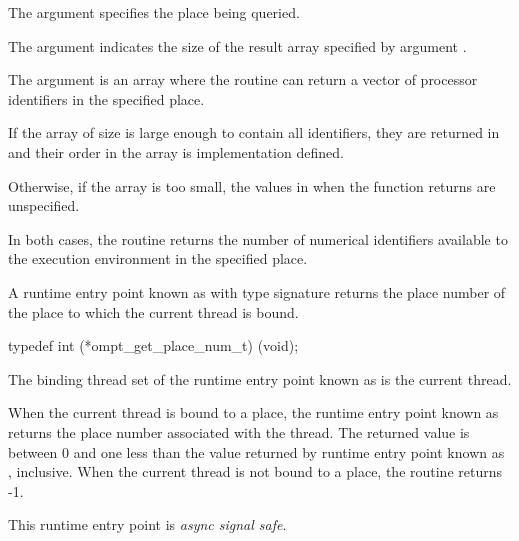 The argument  specifies the place being
queried.

The argument  indicates the size of the result
array specified by argument .

The argument  is an array where the routine can return
a vector of processor identifiers in the specified place.

\effect

If the array  of size  is large enough to
contain all identifiers, they are returned in  and
their order in the array is implementation defined.

Otherwise, if the  array is too small, the values in  when the function returns are unspecified.

In both cases, the routine returns the number of numerical identifiers
available to the execution environment in the specified place.



\label{sec:ompt_get_place_num_t}
\label{sec:ompt_get_place_num}

\summary

A runtime entry point known as
 with type signature
 returns
the place number of the place to which the current
thread is bound.

\format

\begin{ccppspecific}
\begin{omptInquiry}
typedef int (*ompt_get_place_num_t) (void);
\end{omptInquiry}
\end{ccppspecific}


\binding

The binding thread set
of the runtime entry point known as 
is the current thread.

\descr

When the current thread is bound to a place,
the runtime entry point known as 
returns the place number associated with the thread.
The returned value is between 0 and one less than the value returned
by runtime entry point known as , inclusive.
When the current thread is not bound to a place, the routine returns -1.

This runtime entry point is \emph{async signal safe}.


